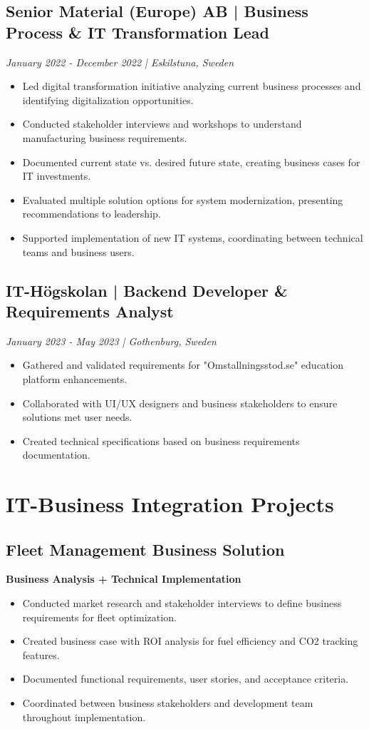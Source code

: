 \documentclass[10pt,a4paper]{article}
\begin{document}
\subsection*{Senior Material (Europe) AB | Business Process \& IT Transformation Lead}
\textit{January 2022 - December 2022 | Eskilstuna, Sweden}
\begin{itemize}[noitemsep]
\item Led digital transformation initiative analyzing current business processes and identifying digitalization opportunities.
\item Conducted stakeholder interviews and workshops to understand manufacturing business requirements.
\item Documented current state vs. desired future state, creating business cases for IT investments.
\item Evaluated multiple solution options for system modernization, presenting recommendations to leadership.
\item Supported implementation of new IT systems, coordinating between technical teams and business users.
\end{itemize}

\subsection*{IT-Högskolan | Backend Developer \& Requirements Analyst}
\textit{January 2023 - May 2023 | Gothenburg, Sweden}
\begin{itemize}[noitemsep]
\item Gathered and validated requirements for "Omstallningsstod.se" education platform enhancements.
\item Collaborated with UI/UX designers and business stakeholders to ensure solutions met user needs.
\item Created technical specifications based on business requirements documentation.
\end{itemize}

\section*{IT-Business Integration Projects}

\subsection*{Fleet Management Business Solution}
\textbf{Business Analysis + Technical Implementation}
\begin{itemize}[noitemsep]
\item Conducted market research and stakeholder interviews to define business requirements for fleet optimization.
\item Created business case with ROI analysis for fuel efficiency and CO2 tracking features.
\item Documented functional requirements, user stories, and acceptance criteria.
\item Coordinated between business stakeholders and development team throughout implementation.
\end{itemize}
\end{document}
